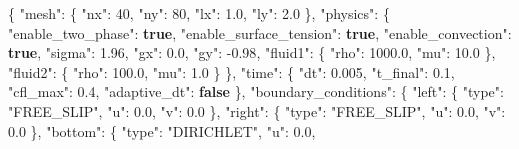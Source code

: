 \documentclass[
  10pt,
]{article}
\newenvironment{Shaded}{}{}
\newcommand{\DataTypeTok}[1]{\textcolor[rgb]{0.56,0.13,0.00}{#1}}
\newcommand{\DecValTok}[1]{\textcolor[rgb]{0.25,0.63,0.44}{#1}}
\newcommand{\FloatTok}[1]{\textcolor[rgb]{0.25,0.63,0.44}{#1}}
\newcommand{\FunctionTok}[1]{\textcolor[rgb]{0.02,0.16,0.49}{#1}}
\newcommand{\KeywordTok}[1]{\textcolor[rgb]{0.00,0.44,0.13}{\textbf{#1}}}
\newcommand{\StringTok}[1]{\textcolor[rgb]{0.25,0.44,0.63}{#1}}
\begin{document}
\begin{Shaded}
\begin{Highlighting}[]
\FunctionTok{\{}
  \DataTypeTok{"mesh"}\FunctionTok{:} \FunctionTok{\{}
    \DataTypeTok{"nx"}\FunctionTok{:} \DecValTok{40}\FunctionTok{,}
    \DataTypeTok{"ny"}\FunctionTok{:} \DecValTok{80}\FunctionTok{,}
    \DataTypeTok{"lx"}\FunctionTok{:} \FloatTok{1.0}\FunctionTok{,}
    \DataTypeTok{"ly"}\FunctionTok{:} \FloatTok{2.0}
  \FunctionTok{\},}
  \DataTypeTok{"physics"}\FunctionTok{:} \FunctionTok{\{}
    \DataTypeTok{"enable\_two\_phase"}\FunctionTok{:} \KeywordTok{true}\FunctionTok{,}
    \DataTypeTok{"enable\_surface\_tension"}\FunctionTok{:} \KeywordTok{true}\FunctionTok{,}
    \DataTypeTok{"enable\_convection"}\FunctionTok{:} \KeywordTok{true}\FunctionTok{,}
    \DataTypeTok{"sigma"}\FunctionTok{:} \FloatTok{1.96}\FunctionTok{,}
    \DataTypeTok{"gx"}\FunctionTok{:} \FloatTok{0.0}\FunctionTok{,}
    \DataTypeTok{"gy"}\FunctionTok{:} \FloatTok{{-}0.98}\FunctionTok{,}
    \DataTypeTok{"fluid1"}\FunctionTok{:} \FunctionTok{\{}
      \DataTypeTok{"rho"}\FunctionTok{:} \FloatTok{1000.0}\FunctionTok{,}
      \DataTypeTok{"mu"}\FunctionTok{:} \FloatTok{10.0}
    \FunctionTok{\},}
    \DataTypeTok{"fluid2"}\FunctionTok{:} \FunctionTok{\{}
      \DataTypeTok{"rho"}\FunctionTok{:} \FloatTok{100.0}\FunctionTok{,}
      \DataTypeTok{"mu"}\FunctionTok{:} \FloatTok{1.0}
    \FunctionTok{\}}
  \FunctionTok{\},}
  \DataTypeTok{"time"}\FunctionTok{:} \FunctionTok{\{}
    \DataTypeTok{"dt"}\FunctionTok{:} \FloatTok{0.005}\FunctionTok{,}
    \DataTypeTok{"t\_final"}\FunctionTok{:} \FloatTok{0.1}\FunctionTok{,}
    \DataTypeTok{"cfl\_max"}\FunctionTok{:} \FloatTok{0.4}\FunctionTok{,}
    \DataTypeTok{"adaptive\_dt"}\FunctionTok{:} \KeywordTok{false}
  \FunctionTok{\},}
  \DataTypeTok{"boundary\_conditions"}\FunctionTok{:} \FunctionTok{\{}
    \DataTypeTok{"left"}\FunctionTok{:} \FunctionTok{\{}
      \DataTypeTok{"type"}\FunctionTok{:} \StringTok{"FREE\_SLIP"}\FunctionTok{,}
      \DataTypeTok{"u"}\FunctionTok{:} \FloatTok{0.0}\FunctionTok{,}
      \DataTypeTok{"v"}\FunctionTok{:} \FloatTok{0.0}
    \FunctionTok{\},}
    \DataTypeTok{"right"}\FunctionTok{:} \FunctionTok{\{}
      \DataTypeTok{"type"}\FunctionTok{:} \StringTok{"FREE\_SLIP"}\FunctionTok{,}
      \DataTypeTok{"u"}\FunctionTok{:} \FloatTok{0.0}\FunctionTok{,}
      \DataTypeTok{"v"}\FunctionTok{:} \FloatTok{0.0}
    \FunctionTok{\},}
    \DataTypeTok{"bottom"}\FunctionTok{:} \FunctionTok{\{}
      \DataTypeTok{"type"}\FunctionTok{:} \StringTok{"DIRICHLET"}\FunctionTok{,}
      \DataTypeTok{"u"}\FunctionTok{:} \FloatTok{0.0}\FunctionTok{,}

\end{Highlighting}
\end{Shaded}
\end{document}
